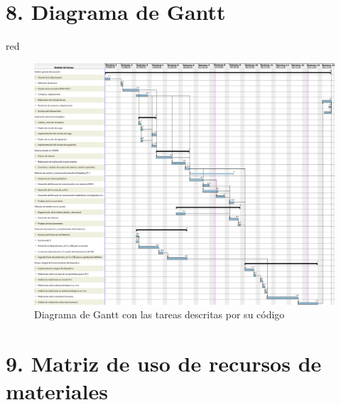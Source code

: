 \documentclass[11pt]{charter}
\begin{document}
\pagebreak
\section{8. Diagrama de Gantt}
\label{sec:gantt}

\begin{consigna}{red}

\begin{figure}[H]
\centering 
\includegraphics[width=1.0\textwidth]{./Figuras/gantt_final.png}
\caption{Diagrama de Gantt con las tareas descritas por su código}
\label{fig:gantt}
\end{figure}
\end{consigna}

\pagebreak
\section{9. Matriz de uso de recursos de materiales}
\label{sec:recursos}
\end{document}
